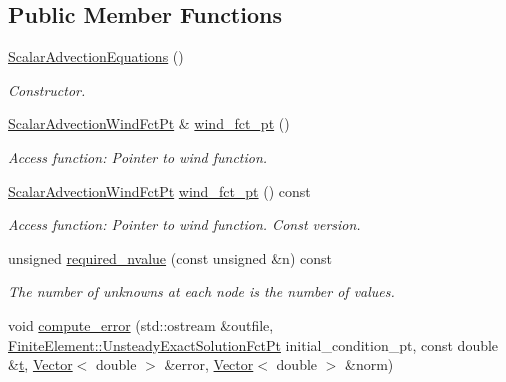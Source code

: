 \subsection*{Public Member Functions}
\begin{DoxyCompactItemize}
\item 
\hyperlink{classoomph_1_1ScalarAdvectionEquations_aeea281c0a811e20894953ceb6fae4b2a}{Scalar\+Advection\+Equations} ()
\begin{DoxyCompactList}\small\item\em Constructor. \end{DoxyCompactList}\item 
\hyperlink{classoomph_1_1ScalarAdvectionEquations_af80d315e76fe7392744d5442f1d2386d}{Scalar\+Advection\+Wind\+Fct\+Pt} \& \hyperlink{classoomph_1_1ScalarAdvectionEquations_aa6de3201b870ea35bf2af0449c10014e}{wind\+\_\+fct\+\_\+pt} ()
\begin{DoxyCompactList}\small\item\em Access function\+: Pointer to wind function. \end{DoxyCompactList}\item 
\hyperlink{classoomph_1_1ScalarAdvectionEquations_af80d315e76fe7392744d5442f1d2386d}{Scalar\+Advection\+Wind\+Fct\+Pt} \hyperlink{classoomph_1_1ScalarAdvectionEquations_a8630d7c8b9771f291701547b3dd10f3c}{wind\+\_\+fct\+\_\+pt} () const
\begin{DoxyCompactList}\small\item\em Access function\+: Pointer to wind function. Const version. \end{DoxyCompactList}\item 
unsigned \hyperlink{classoomph_1_1ScalarAdvectionEquations_a71a3c28feb1156376cbf55e7043e27e8}{required\+\_\+nvalue} (const unsigned \&n) const
\begin{DoxyCompactList}\small\item\em The number of unknowns at each node is the number of values. \end{DoxyCompactList}\item 
void \hyperlink{classoomph_1_1ScalarAdvectionEquations_ae94eb3569c9fd7f9e07defb77006cd63}{compute\+\_\+error} (std\+::ostream \&outfile, \hyperlink{classoomph_1_1FiniteElement_ad4ecf2b61b158a4b4d351a60d23c633e}{Finite\+Element\+::\+Unsteady\+Exact\+Solution\+Fct\+Pt} initial\+\_\+condition\+\_\+pt, const double \&\hyperlink{cfortran_8h_af6f0bd3dc13317f895c91323c25c2b8f}{t}, \hyperlink{classoomph_1_1Vector}{Vector}$<$ double $>$ \&error, \hyperlink{classoomph_1_1Vector}{Vector}$<$ double $>$ \&norm)
\end{DoxyCompactItemize}
